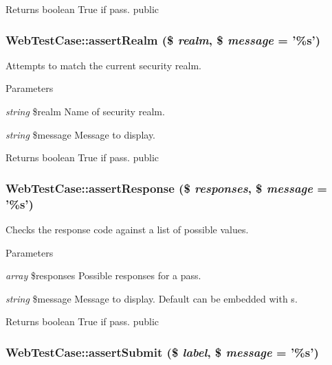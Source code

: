 \begin{DoxyReturn}{Returns}
boolean True if pass.  public 
\end{DoxyReturn}
\hypertarget{class_web_test_case_acc61e0a6d07f19005ee26e1cf98b813b}{
\subsubsection[{assertRealm}]{\setlength{\rightskip}{0pt plus 5cm}WebTestCase::assertRealm (\$ {\em realm}, \/  \$ {\em message} = {\ttfamily '\%s'})}}
\label{class_web_test_case_acc61e0a6d07f19005ee26e1cf98b813b}
Attempts to match the current security realm. 
\begin{DoxyParams}{Parameters}
\item[{\em string}]\$realm Name of security realm. \item[{\em string}]\$message Message to display. \end{DoxyParams}
\begin{DoxyReturn}{Returns}
boolean True if pass.  public 
\end{DoxyReturn}
\hypertarget{class_web_test_case_a974043ce5e246d9d61aa2432fa460118}{
\subsubsection[{assertResponse}]{\setlength{\rightskip}{0pt plus 5cm}WebTestCase::assertResponse (\$ {\em responses}, \/  \$ {\em message} = {\ttfamily '\%s'})}}
\label{class_web_test_case_a974043ce5e246d9d61aa2432fa460118}
Checks the response code against a list of possible values. 
\begin{DoxyParams}{Parameters}
\item[{\em array}]\$responses Possible responses for a pass. \item[{\em string}]\$message Message to display. Default can be embedded with s. \end{DoxyParams}
\begin{DoxyReturn}{Returns}
boolean True if pass.  public 
\end{DoxyReturn}
\hypertarget{class_web_test_case_a56874c6913a45fe55a581128a1e956e4}{
\subsubsection[{assertSubmit}]{\setlength{\rightskip}{0pt plus 5cm}WebTestCase::assertSubmit (\$ {\em label}, \/  \$ {\em message} = {\ttfamily '\%s'})}}

